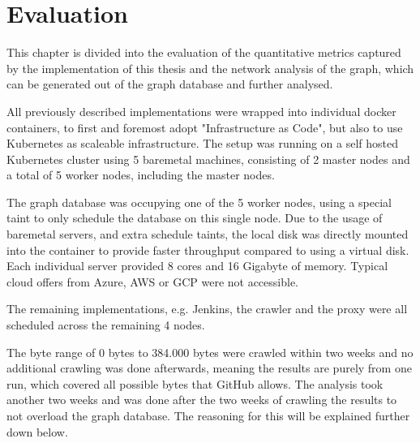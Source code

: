 \chapter{Evaluation}

This chapter is divided into the evaluation of the quantitative metrics captured by the implementation of this thesis and the network analysis of the graph, which can be generated out of the graph database and further analysed.

All previously described implementations were wrapped into individual docker containers, to first and foremost adopt "Infrastructure as Code", but also to use Kubernetes as scaleable infrastructure. The setup was running on a self hosted Kubernetes cluster using 5 baremetal machines, consisting of 2 master nodes and a total of 5 worker nodes, including the master nodes.

The graph database was occupying one of the 5 worker nodes, using a special taint to only schedule the database on this single node. Due to the usage of baremetal servers, and extra schedule taints, the local disk was directly mounted into the container to provide faster throughput compared to using a virtual disk. Each individual server provided 8 cores and 16 Gigabyte of memory. Typical cloud offers from Azure, AWS or GCP were not accessible.

The remaining implementations, e.g. Jenkins, the crawler and the proxy were all scheduled across the remaining 4 nodes.

The byte range of 0 bytes to 384.000 bytes were crawled within two weeks and no additional crawling was done afterwards, meaning the results are purely from one run, which covered all possible bytes that GitHub allows. The analysis took another two weeks and was done after the two weeks of crawling the results to not overload the graph database. The reasoning for this will be explained further down below.

